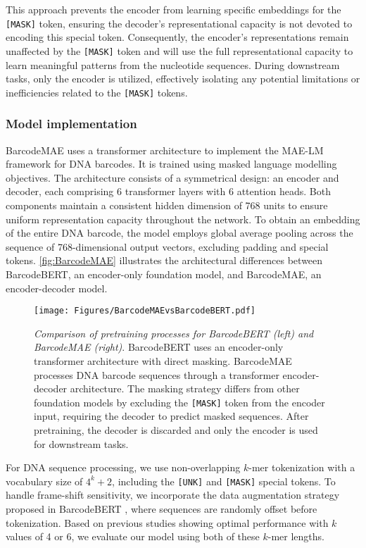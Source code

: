 This approach prevents the encoder from learning specific embeddings for the \texttt{[MASK]} token, ensuring the decoder's representational capacity is not devoted to encoding this special token. Consequently, the encoder's representations remain unaffected by the \texttt{[MASK]} token and will use the full representational capacity to learn meaningful patterns from the nucleotide sequences. During downstream tasks, only the encoder is utilized, effectively isolating any potential limitations or inefficiencies related to the \texttt{[MASK]} tokens.

\subsubsection{Model implementation}


BarcodeMAE uses a transformer architecture to implement the MAE-LM framework for DNA barcodes. It is trained using masked language modelling objectives. The architecture consists of a symmetrical design: an encoder and decoder, each comprising 6 transformer layers with 6 attention heads. Both components maintain a consistent hidden dimension of 768 units to ensure uniform representation capacity throughout the network. 
To obtain an embedding of the entire DNA barcode, the model employs global average pooling across the sequence of 768-dimensional output vectors, excluding padding and special tokens. \autoref{fig:BarcodeMAE} illustrates the architectural differences between BarcodeBERT, an encoder-only foundation model, and BarcodeMAE, an encoder-decoder model.

\begin{figure}[!h]
    \centering
    \texttt{[image: Figures/BarcodeMAEvsBarcodeBERT.pdf]}
    \caption{\textit{Comparison of pretraining processes for BarcodeBERT (left) and BarcodeMAE (right)}. 
    BarcodeBERT uses an encoder-only transformer architecture with direct masking. BarcodeMAE processes DNA barcode sequences through a transformer encoder-decoder architecture. The masking strategy differs from other foundation models by excluding the \texttt{[MASK]} token from the encoder input, requiring the decoder to predict masked sequences. After pretraining, the decoder is discarded and only the encoder is used for downstream tasks.}
    \label{fig:BarcodeMAE}
\end{figure}

For DNA sequence processing, we use non-overlapping $k$-mer tokenization with a vocabulary size of $4^k + 2$, including the \texttt{[UNK]} and \texttt{[MASK]} special tokens. To handle frame-shift sensitivity, we incorporate the data augmentation strategy proposed in BarcodeBERT \citep{arias2023barcodebert}, where sequences are randomly offset before tokenization. Based on previous studies \citep{arias2023barcodebert, NucleotideTransformerDalla-Torre2023} showing optimal performance with $k$ values of 4 or 6, we evaluate our model using both of these $k$-mer lengths.

